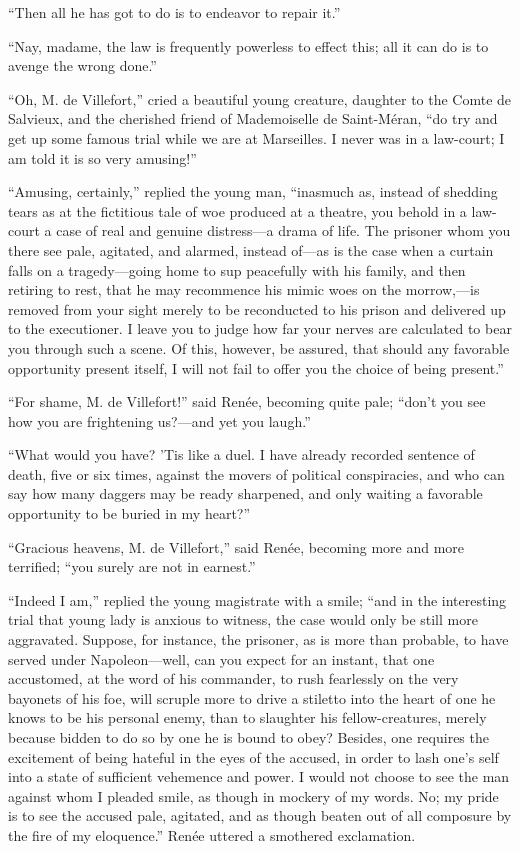 “Then all he has got to do is to endeavor to repair it.”

“Nay, madame, the law is frequently powerless to effect this; all it
can do is to avenge the wrong done.”

“Oh, M. de Villefort,” cried a beautiful young creature, daughter to
the Comte de Salvieux, and the cherished friend of Mademoiselle de
Saint-Méran, “do try and get up some famous trial while we are at
Marseilles. I never was in a law-court; I am told it is so very
amusing!”

“Amusing, certainly,” replied the young man, “inasmuch as, instead of
shedding tears as at the fictitious tale of woe produced at a theatre,
you behold in a law-court a case of real and genuine distress—a drama
of life. The prisoner whom you there see pale, agitated, and alarmed,
instead of—as is the case when a curtain falls on a tragedy—going home
to sup peacefully with his family, and then retiring to rest, that he
may recommence his mimic woes on the morrow,—is removed from your sight
merely to be reconducted to his prison and delivered up to the
executioner. I leave you to judge how far your nerves are calculated to
bear you through such a scene. Of this, however, be assured, that
should any favorable opportunity present itself, I will not fail to
offer you the choice of being present.”

“For shame, M. de Villefort!” said Renée, becoming quite pale; “don’t
you see how you are frightening us?—and yet you laugh.”

“What would you have? ’Tis like a duel. I have already recorded
sentence of death, five or six times, against the movers of political
conspiracies, and who can say how many daggers may be ready sharpened,
and only waiting a favorable opportunity to be buried in my heart?”

“Gracious heavens, M. de Villefort,” said Renée, becoming more and more
terrified; “you surely are not in earnest.”

“Indeed I am,” replied the young magistrate with a smile; “and in the
interesting trial that young lady is anxious to witness, the case would
only be still more aggravated. Suppose, for instance, the prisoner, as
is more than probable, to have served under Napoleon—well, can you
expect for an instant, that one accustomed, at the word of his
commander, to rush fearlessly on the very bayonets of his foe, will
scruple more to drive a stiletto into the heart of one he knows to be
his personal enemy, than to slaughter his fellow-creatures, merely
because bidden to do so by one he is bound to obey? Besides, one
requires the excitement of being hateful in the eyes of the accused, in
order to lash one’s self into a state of sufficient vehemence and
power. I would not choose to see the man against whom I pleaded smile,
as though in mockery of my words. No; my pride is to see the accused
pale, agitated, and as though beaten out of all composure by the fire
of my eloquence.” Renée uttered a smothered exclamation.

